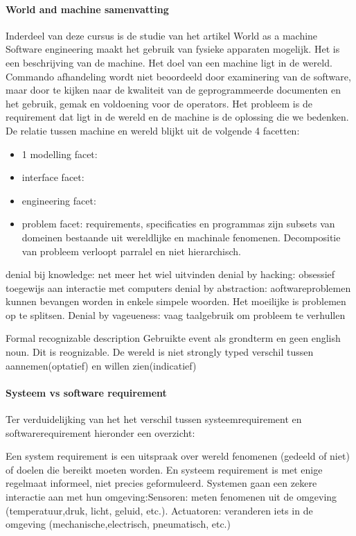 \documentclass{article}
\begin{document}
	\paragraph{World and machine samenvatting}
	Inderdeel van deze cursus is de studie van het artikel World as a machine \cite{jacksonworldmachine}
	Software engineering maakt het gebruik van fysieke apparaten mogelijk. Het is een beschrijving van de machine. Het doel van een machine ligt in de wereld.
	Commando afhandeling wordt niet  beoordeeld door examinering van de software, maar door te kijken naar de kwaliteit van de geprogrammeerde documenten en het gebruik, gemak en voldoening voor de operators.
	Het probleem is de requirement dat ligt in de wereld en de machine is de oplossing die we bedenken. De  relatie tussen machine en wereld  blijkt uit de volgende 4 facetten:
	\begin{itemize}
		\item 1 modelling facet:
		\item interface facet:
		\item engineering facet:
		\item problem facet: requirements, specificaties en programmas zijn subsets van  domeinen bestaande uit wereldlijke en machinale fenomenen. Decompositie van  probleem verloopt parralel en niet hierarchisch.
	\end{itemize}
	denial bij knowledge: net meer het wiel uitvinden
	denial by hacking: obsessief toegewijs aan interactie met computers
	denial by abstraction: aoftwareproblemen kunnen bevangen worden in enkele simpele woorden. Het moeilijke is problemen op te splitsen.
	Denial by vageueness: vaag taalgebruik om probleem te verhullen
	
	Formal recognizable description
	Gebruikte event als grondterm en geen english noun. Dit is reognizable.
	De wereld is niet strongly typed
	verschil tussen aannemen(optatief) en willen zien(indicatief)
	
	
	
	
	\paragraph{Systeem vs software requirement}
	Ter verduidelijking van het het verschil tussen systeemrequirement en softwarerequirement hieronder een overzicht:
	
	
	Een system requirement is een uitspraak over wereld fenomenen (gedeeld of niet) of doelen
	die bereikt moeten worden. En systeem requirement is met enige regelmaat informeel, niet precies geformuleerd.
	Systemen gaan een zekere interactie aan met hun omgeving:Sensoren: meten fenomenen uit de omgeving (temperatuur,druk, licht, geluid, etc.). Actuatoren: veranderen iets in de omgeving (mechanische,electrisch, pneumatisch, etc.)
	
\end{document}
